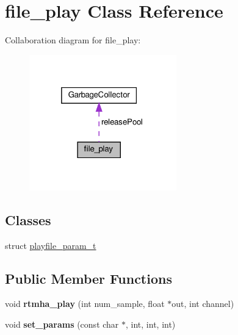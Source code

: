 \hypertarget{classfile__play}{}\section{file\+\_\+play Class Reference}
\label{classfile__play}


Collaboration diagram for file\+\_\+play\+:\nopagebreak
\begin{figure}[H]
\begin{center}
\leavevmode
\includegraphics[width=181pt]{classfile__play__coll__graph}
\end{center}
\end{figure}
\subsection*{Classes}
\begin{DoxyCompactItemize}
\item 
struct \hyperlink{structfile__play_1_1playfile__param__t}{playfile\+\_\+param\+\_\+t}
\end{DoxyCompactItemize}
\subsection*{Public Member Functions}
\begin{DoxyCompactItemize}
\item 
\mbox{\label{classfile__play_a645ba3e1de2ac795764c06c70a9017c3}} 
void {\bfseries rtmha\+\_\+play} (int num\+\_\+sample, float $\ast$out, int channel)
\item 
\mbox{\label{classfile__play_a73ab11b570cd0dfb27afd66a1c6d325d}} 
void {\bfseries set\+\_\+params} (const char $\ast$, int, int, int)
\end{DoxyCompactItemize}
